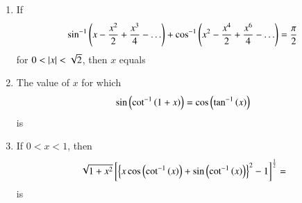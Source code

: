 \documentclass[journal,12pt,onecolumn,article]{IEEEtran}
\theoremstyle{remark}
\begin{document}
\begin{enumerate}
\begin{enumerate}
\end{enumerate}
\item If
\begin{align*}
\sin ^{-1}\left(x-\frac{x^2}{2}+\frac{x^3}{4}-\ldots\right)+ \cos ^{-1}\left(x^2-\frac{x^4}{2}+\frac{x^6}{4}-\ldots\right)=\frac{\pi}{2}
\end{align*}
for $0<\left\vert x\right\vert<\sqrt{2}$, then $x$ equals 
\hfill {}
\begin{enumerate}
\end{enumerate}
\item The value of $x$ for which 
\begin{align*}
\sin\left(\cot^{-1}\left(1+x\right)\right)=\cos \left(\tan ^{-1}\left(x\right)\right)
\end{align*}
is 
\hfill {}
\begin{enumerate}
\end{enumerate}
\item  If $0<x<1$, then 
\begin{multline*}
\sqrt{1+x^2}{}\left[\left\{ x\cos \left(\cot ^{-1}\left(x\right)\right)+ \sin \left(\cot ^{-1}\left(x\right)\right)\right\}^2 - 1\right]^{\frac{1}{2}}=
\end{multline*}
is
\hfill {}
\begin{enumerate}
\end{enumerate}
\end{enumerate}
\end{document}
